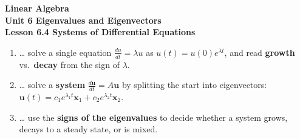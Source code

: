\documentclass[10pt]{article}
\begin{document}
\vspace{-0.8in}

\begin{center}
  {\color{white}\textbf{\LARGE Linear Algebra}}\\[4pt]
  {\color{blushmid}\large\textbf{Unit 6 \quad Eigenvalues and Eigenvectors}}\\[6pt]
  {\color{white}\textbf{\large Lesson 6.4 \quad Systems of Differential Equations}}
\end{center}

\vspace{0.22in}
\namedateperiod
\vspace{0.18in}

\begin{learningtargetbox}
\small
\begin{enumerate}[leftmargin=1.5em, itemsep=5pt]
  \item \ldots{} solve a single equation $\frac{du}{dt}=\lambda u$ as $u(t)=u(0)e^{\lambda t}$, and read \textbf{growth} vs.\ \textbf{decay} from the sign of $\lambda$.
  \item \ldots{} solve a \textbf{system} $\frac{d\mathbf{u}}{dt}=A\mathbf{u}$ by splitting the start into eigenvectors: $\mathbf{u}(t)=c_1e^{\lambda_1 t}\mathbf{x}_1+c_2e^{\lambda_2 t}\mathbf{x}_2$.
  \item \ldots{} use the \textbf{signs of the eigenvalues} to decide whether a system grows, decays to a steady state, or is mixed.
\end{enumerate}
\end{learningtargetbox}

\vspace{0.14in}
\end{document}

